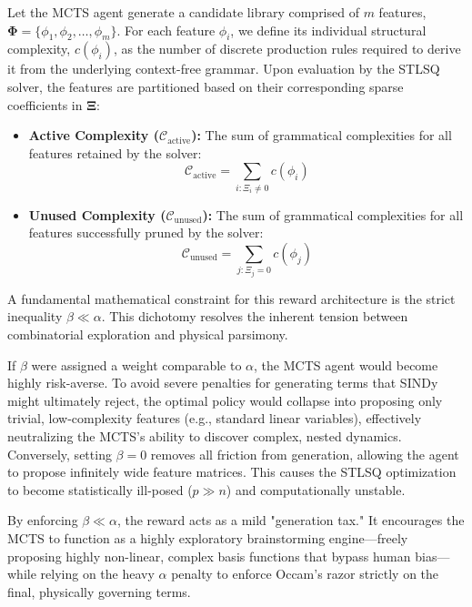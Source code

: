 \documentclass[11pt,a4paper]{article}
\begin{document}
Let the MCTS agent generate a candidate library comprised of $m$ features, $\mathbf{\Phi} = \{\phi_1, \phi_2, \dots, \phi_m\}$. For each feature $\phi_i$, we define its individual structural complexity, $c(\phi_i)$, as the number of discrete production rules required to derive it from the underlying context-free grammar. Upon evaluation by the STLSQ solver, the features are partitioned based on their corresponding sparse coefficients in $\mathbf{\Xi}$:

\begin{itemize}
    \item \textbf{Active Complexity ($\mathcal{C}_{\text{active}}$):} The sum of grammatical complexities for all features retained by the solver: 
    \begin{equation}
        \mathcal{C}_{\text{active}} = \sum_{i : \Xi_i \neq 0} c(\phi_i)
    \end{equation}
    \item \textbf{Unused Complexity ($\mathcal{C}_{\text{unused}}$):} The sum of grammatical complexities for all features successfully pruned by the solver: 
    \begin{equation}
        \mathcal{C}_{\text{unused}} = \sum_{j : \Xi_j = 0} c(\phi_j)
    \end{equation}
\end{itemize}

A fundamental mathematical constraint for this reward architecture is the strict inequality $\beta \ll \alpha$. This dichotomy resolves the inherent tension between combinatorial exploration and physical parsimony. 

If $\beta$ were assigned a weight comparable to $\alpha$, the MCTS agent would become highly risk-averse. To avoid severe penalties for generating terms that SINDy might ultimately reject, the optimal policy would collapse into proposing only trivial, low-complexity features (e.g., standard linear variables), effectively neutralizing the MCTS's ability to discover complex, nested dynamics. Conversely, setting $\beta = 0$ removes all friction from generation, allowing the agent to propose infinitely wide feature matrices. This causes the STLSQ optimization to become statistically ill-posed ($p \gg n$) and computationally unstable.

By enforcing $\beta \ll \alpha$, the reward acts as a mild "generation tax." It encourages the MCTS to function as a highly exploratory brainstorming engine—freely proposing highly non-linear, complex basis functions that bypass human bias—while relying on the heavy $\alpha$ penalty to enforce Occam's razor strictly on the final, physically governing terms.
\end{document}
